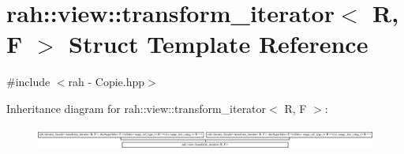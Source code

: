 \hypertarget{structrah_1_1view_1_1transform__iterator}{}\section{rah\+::view\+::transform\+\_\+iterator$<$ R, F $>$ Struct Template Reference}
\label{structrah_1_1view_1_1transform__iterator}


{\ttfamily \#include $<$rah -\/ Copie.\+hpp$>$}

Inheritance diagram for rah\+::view\+::transform\+\_\+iterator$<$ R, F $>$\+:\begin{figure}[H]
\begin{center}
\leavevmode
\includegraphics[height=0.729167cm]{structrah_1_1view_1_1transform__iterator}
\end{center}
\end{figure}

